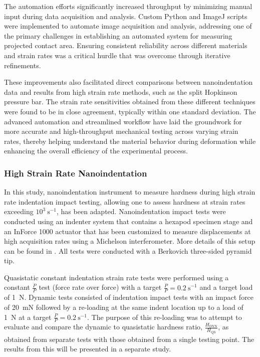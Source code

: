The automation efforts significantly increased throughput by minimizing manual input during data acquisition and analysis. Custom Python and ImageJ scripts were implemented to automate image acquisition and analysis, addressing one of the primary challenges in establishing an automated system for measuring projected contact area. Ensuring consistent reliability across different materials and strain rates was a critical hurdle that was overcome through iterative refinements.


These improvements also facilitated direct comparisons between nanoindentation data and results from high strain rate methods, such as the split Hopkinson pressure bar. The strain rate sensitivities obtained from these different techniques were found to be in close agreement, typically within one standard deviation. The advanced automation and streamlined workflow have laid the groundwork for more accurate and high-throughput mechanical testing across varying strain rates, thereby helping understand the material behavior during deformation while enhancing the overall efficiency of the experimental process.


\subsubsection{High Strain Rate Nanoindentation}

In this study, nanoindentation instrument to measure hardness during high strain rate indentation impact testing, allowing one to assess hardness at strain rates exceeding \(10^{3}~\text{s}^{-1}\), has been adapted. Nanoindentation impact tests were conducted using an indenter system that contains a hexapod specimen stage and an InForce 1000 actuator that has been customized to measure displacements at high acquisition rates using a Michelson interferometer. More details of this setup can be found in \cite{Hackett2023}. All tests were conducted with a Berkovich three-sided pyramid tip.

Quasistatic constant indentation strain rate tests were performed using a constant \(\frac{\dot{P}}{P}\) test (force rate over force) with a target \(\frac{\dot{P}}{P} = 0.2~\text{s}^{-1}\) and a target load of 1~N. Dynamic tests consisted of indentation impact tests with an impact force of 20~mN followed by a re-loading at the same indent location up to a load of 1~N at a target \(\frac{\dot{P}}{P} = 0.2~\text{s}^{-1}\). The purpose of this re-loading was to attempt to evaluate and compare the dynamic to quasistatic hardness ratio, \(\frac{H_{\text{DYN}}}{H_{\text{QS}}}\), as obtained from separate tests with those obtained from a single testing point. The results from this will be presented in a separate study.

